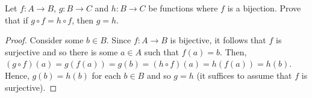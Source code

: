 \documentclass[12pt]{article}
\newenvironment{problem}[2][Problem]{\begin{trivlist} \item[\hskip \labelsep {\bfseries #1}\hskip \labelsep {\bfseries #2.}]}{\end{trivlist}}
\begin{document}
    \begin{problem}{59}
      Let $f:A\to B$, $g:B\to C$ and $h:B\to C$ be functions where $f$ is a bijection. Prove that if $g\circ f = h\circ f$, then $g=h$.
    \end{problem}
    \begin{proof}
      Consider some $b\in B$. Since $f:A\to B$ is bijective, it follows that $f$ is surjective and so there is some $a\in A$ such that $f(a) =b$. Then, $(g\circ f)(a) = g(f(a)) = g(b) =  (h\circ f)(a) = h(f(a)) = h(b)$. Hence, $g(b) = h(b)$ for each $b\in B$ and so $g=h$ (it suffices to assume that $f$ is surjective).
    \end{proof}


       
\end{document}
